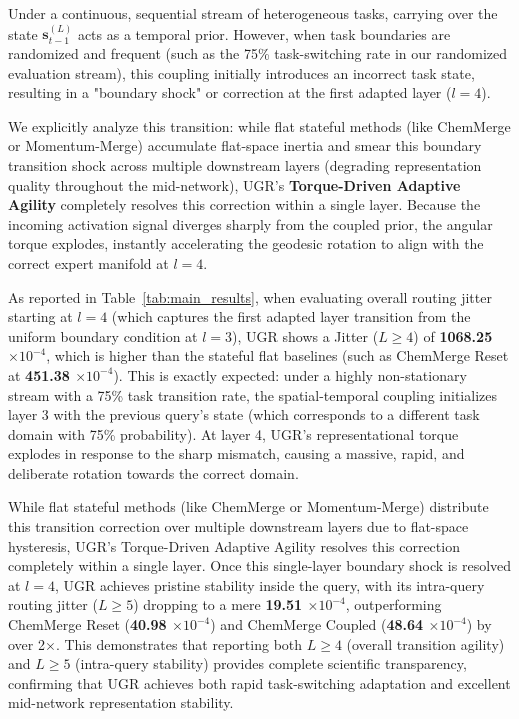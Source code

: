 Under a continuous, sequential stream of heterogeneous tasks, carrying over the state $\mathbf{s}_{t-1}^{(L)}$ acts as a temporal prior. However, when task boundaries are randomized and frequent (such as the 75\% task-switching rate in our randomized evaluation stream), this coupling initially introduces an incorrect task state, resulting in a "boundary shock" or correction at the first adapted layer ($l=4$). 

We explicitly analyze this transition: while flat stateful methods (like ChemMerge or Momentum-Merge) accumulate flat-space inertia and smear this boundary transition shock across multiple downstream layers (degrading representation quality throughout the mid-network), UGR's \textbf{Torque-Driven Adaptive Agility} completely resolves this correction within a single layer. Because the incoming activation signal diverges sharply from the coupled prior, the angular torque explodes, instantly accelerating the geodesic rotation to align with the correct expert manifold at $l=4$. 

As reported in Table~\ref{tab:main_results}, when evaluating overall routing jitter starting at $l=4$ (which captures the first adapted layer transition from the uniform boundary condition at $l=3$), UGR shows a Jitter ($L \ge 4$) of \textbf{1068.25 $\times 10^{-4}$}, which is higher than the stateful flat baselines (such as ChemMerge Reset at \textbf{451.38 $\times 10^{-4}$}). This is exactly expected: under a highly non-stationary stream with a 75\% task transition rate, the spatial-temporal coupling initializes layer 3 with the previous query's state (which corresponds to a different task domain with 75\% probability). At layer 4, UGR's representational torque explodes in response to the sharp mismatch, causing a massive, rapid, and deliberate rotation towards the correct domain.

While flat stateful methods (like ChemMerge or Momentum-Merge) distribute this transition correction over multiple downstream layers due to flat-space hysteresis, UGR's Torque-Driven Adaptive Agility resolves this correction completely within a single layer. Once this single-layer boundary shock is resolved at $l=4$, UGR achieves pristine stability inside the query, with its intra-query routing jitter ($L \ge 5$) dropping to a mere \textbf{19.51 $\times 10^{-4}$}, outperforming ChemMerge Reset (\textbf{40.98 $\times 10^{-4}$}) and ChemMerge Coupled (\textbf{48.64 $\times 10^{-4}$}) by over 2$\times$. This demonstrates that reporting both $L \ge 4$ (overall transition agility) and $L \ge 5$ (intra-query stability) provides complete scientific transparency, confirming that UGR achieves both rapid task-switching adaptation and excellent mid-network representation stability.

